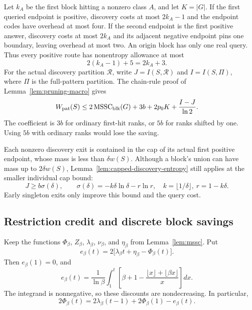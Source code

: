 Let $k_A$ be the first block hitting a nonzero class $A$, and let
$K=|G|$. If the first queried endpoint is positive, discovery costs
at most $2k_A-1$ and the endpoint codes have overhead at most four.
If the second endpoint is the first positive answer, discovery costs
at most $2k_A$ and its adjacent negative endpoint pins one boundary,
leaving overhead at most two. An origin block has only one real query.
Thus every positive route has nonentropy allowance at most
\[
 2(k_A-1)+5=2k_A+3.
\]
For the actual discovery partition $\mathcal R$, write
$J=I(S,\mathcal R)$ and $I=I(S,\Pi)$, where $\Pi$ is the full-pattern
partition. The chain-rule proof of Lemma~\ref{lem:pruning-macro} gives
\begin{equation}\label{eq:poly-block-stage}
 W_{\mathrm{pat}}(S)\le
 2\operatorname{MSSC}_{\mathrm{blk}}(G)+3b+2p_0K+\frac{I-J}{\ln2}.
\end{equation}
The coefficient is $3b$ for ordinary first-hit ranks, or $5b$ for ranks
shifted by one. Using $5b$ with ordinary ranks would lose the saving.

Each nonzero discovery exit is contained in the cap of its actual
first positive endpoint, whose mass is less than $\delta w(S)$.
Although a block's union can have mass up to $2\delta w(S)$,
Lemma~\ref{lem:capped-discovery-entropy} still applies at the smaller
individual cap bound:
\begin{equation}\label{eq:poly-block-entropy}
 J\ge b\sigma(\delta),\qquad
 \sigma(\delta)=-k\delta\ln\delta-r\ln r,
 \quad k=\lfloor1/\delta\rfloor,\ r=1-k\delta.
\end{equation}
Early singleton exits only improve this bound and the query cost.

\subsection{Restriction credit and discrete block savings}

Keep the functions $\Phi_\beta$, $Z_\beta$, $\lambda_\beta$,
$\nu_\beta$, and $\eta_\beta$ from Lemma~\ref{lem:mssc}. Put
\[
 e_\beta(t)=2\bigl[\lambda_\beta t+\eta_\beta-\Phi_\beta(t)\bigr].
\]
Then $e_\beta(1)=0$, and
\[
 e_\beta(t)=\frac1{\ln\beta}\int_1^t
 \left[\beta+1-\frac{\lfloor x\rfloor+\lfloor\beta x\rfloor}{x}\right]dx.
\]
The integrand is nonnegative, so these discounts are nondecreasing.
In particular,
\begin{equation}\label{eq:poly-block-phi}
 2\Phi_\beta(t)=2\lambda_\beta(t-1)+2\Phi_\beta(1)-e_\beta(t).
\end{equation}

